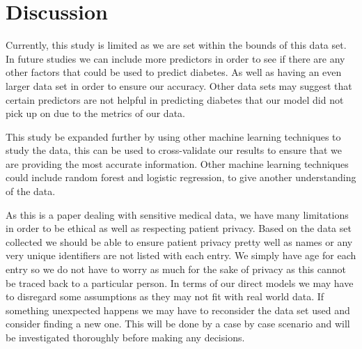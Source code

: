 \documentclass[12pt]{article}
\begin{document}
\section{Discussion}
\label{sec:disc}

Currently, this study is limited as we are set within the bounds of this data set. In future studies we can include more predictors in 
order to see if there are any other factors that could be used to predict diabetes. As well as having an even larger data set in order to 
ensure our accuracy. Other data sets may suggest that certain predictors are not helpful in predicting diabetes that our model did not pick 
up on due to the metrics of our data. 

This study be expanded further by using other machine learning techniques to study the data, this can be used to cross-validate our results to ensure
that we are providing the most accurate information. Other machine learning techniques could include random forest and logistic regression, to give another
understanding of the data.

As this is a paper dealing with sensitive medical data, we have many limitations in order to be ethical as well as respecting patient 
privacy. Based on the data set collected we should be able to ensure patient privacy pretty well as names or any very unique identifiers 
are not listed with each entry. We simply have age for each entry so we do not have to worry as much for the sake of privacy as this cannot be traced
back to a particular person. In terms of our direct models we may have to disregard some assumptions as they may not fit with real world data. If something unexpected 
happens we may have to reconsider the data set used and consider finding a new one. This will be done by a case by case scenario and will 
be investigated thoroughly before making any decisions.



\end{document}
